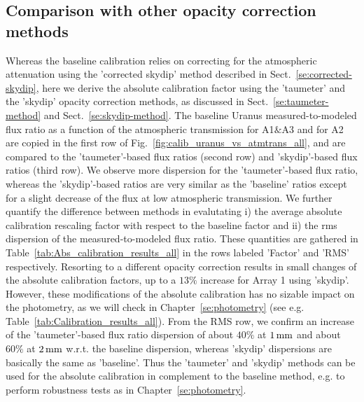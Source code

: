 \subsection{Comparison with other opacity correction methods}

Whereas the baseline calibration relies on correcting for the
atmospheric attenuation using the 'corrected skydip' method described
in Sect.~\ref{se:corrected-skydip}, here we derive the absolute
calibration factor using the 'taumeter' and the 'skydip' opacity
correction methods, as discussed in Sect.~\ref{se:taumeter-method} and
Sect.~\ref{se:skydip-method}. The baseline Uranus measured-to-modeled
flux ratio as a function of the atmospheric transmission for A1$\&$A3
and for A2 are copied in the first row of
Fig.~\ref{fig:calib_uranus_vs_atmtrans_all}, and are
compared to the 'taumeter'-based flux ratios (second row) and
'skydip'-based flux ratios (third row). We observe more dispersion for
the 'taumeter'-based flux ratio, whereas the 'skydip'-based ratios are
very similar as the 'baseline' ratios except for a slight decrease of
the flux at low atmospheric transmission. We further quantify the
difference between methods in evalutating i) the average absolute
calibration rescaling factor with respect to the baseline factor and
ii) the rms dispersion of the measured-to-modeled flux ratio. These
quantities are gathered in Table~\ref{tab:Abs_calibration_results_all}
in the rows labeled 'Factor' and 'RMS' respectively. Resorting to a
different opacity correction results in small changes of the absolute
calibration factors, up to a $13\%$ increase for Array 1 using
'skydip'. However, these modifications of the absolute calibration has
no sizable impact on the photometry, as we will check in
Chapter~\ref{se:photometry} (see
e.g. Table~\ref{tab:Calibration_results_all}). From the RMS row, we
confirm an increase of the 'taumeter'-based flux ratio dispersion of
about $40\%$ at $1\,\rm{mm}$ and about $60\%$ at $2\,\rm{mm}$ w.r.t. the baseline
dispersion, whereas 'skydip' dispersions are basically the same as
'baseline'. Thus the 'taumeter' and 'skydip' methods can be used for
the absolute calibration in complement to the baseline method, e.g. to
perform robustness tests as in Chapter~\ref{se:photometry}.  

  


